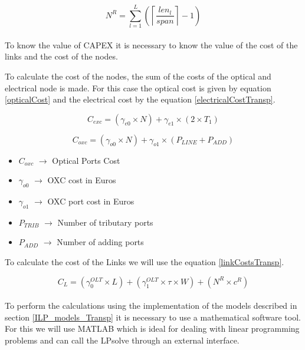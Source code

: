 \begin{equation}
N^R = \sum\limits_{l=1}^L\left(\left\lceil\frac{len_l}{span}\right\rceil-1\right)
\label{amplifiersTransp}
\end{equation} \\

To know the value of CAPEX it is necessary to know the value of the cost of the links and the cost of the nodes.

To calculate the cost of the nodes, the sum of the costs of the optical and electrical node is made. For this case the optical cost is given by equation \ref{opticalCost} and the electrical cost by the equation \ref{electricalCostTransp}.


\begin{equation}
C_{exc} = \left(\gamma_{e0}\times N\right) + \gamma_{e1} \times \left(2 \times T_1 \right)		\label{electricalCostTransp}
\end{equation}

\begin{equation}
C_{oxc} = \left(\gamma_{o0} \times N \right) + \gamma_{o1} \times  \left(P_{LINE} + P_{ADD}\right)
\label{opticalCost}
\end{equation}	
	
\begin{itemize}
\item{$C_{oxc}$		$\rightarrow$	Optical Ports Cost}
\item{$\gamma_{o0}$	$\rightarrow$	OXC cost in Euros}
\item{$\gamma_{o1}$	$\rightarrow$	OXC port cost in Euros}
\item{$P_{TRIB}	$	$\rightarrow$	Number of tributary ports}
\item{$P_{ADD} $	$\rightarrow$	Number of adding ports}
\end{itemize}

\vspace{10pt}
To calculate the cost of the Links we will use the equation \ref{linkCostsTransp}.

\begin{equation}
C_L = \left(\gamma_0^{OLT} \times L\right) + \left(\gamma_1^{OLT} \times \tau \times W\right) + \left(N^R \times c^R\right)
\label{linkCostsTransp}
\end{equation} \\
	
To perform the calculations using the implementation of the models described in section \ref{ILP_models_Transp} it is necessary to use a mathematical software tool. For this we will use MATLAB which is ideal for dealing with linear programming problems and can call the LPsolve through an external interface.


